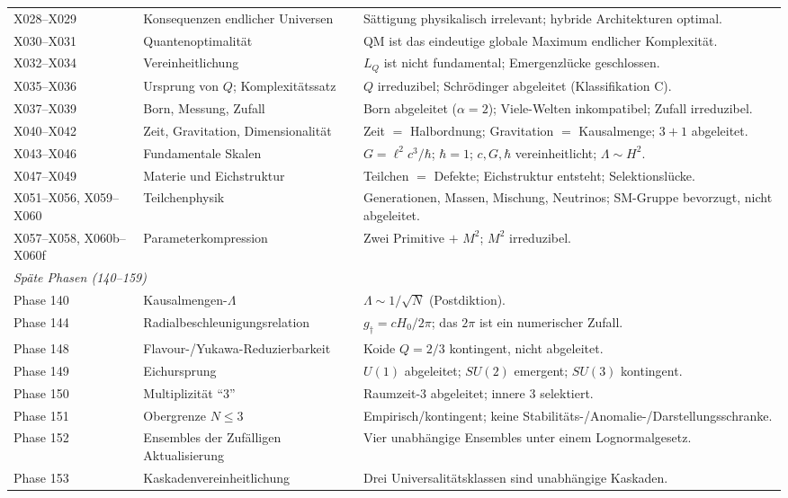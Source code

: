 \documentclass[10pt,twoside,openany]{book}
\begin{document}
\begin{longtable}{p{4.2cm}p{5.2cm}p{5.6cm}}
X028--X029 & Konsequenzen endlicher Universen & Sättigung physikalisch irrelevant; hybride Architekturen optimal. \\
X030--X031 & Quantenoptimalität & QM ist das eindeutige globale Maximum endlicher Komplexität. \\
X032--X034 & Vereinheitlichung & $L_Q$ ist nicht fundamental; Emergenzlücke geschlossen. \\
X035--X036 & Ursprung von $Q$; Komplexitätssatz & $Q$ irreduzibel; Schr\"odinger abgeleitet (Klassifikation C). \\
X037--X039 & Born, Messung, Zufall & Born abgeleitet ($\alpha=2$); Viele-Welten inkompatibel; Zufall irreduzibel. \\
X040--X042 & Zeit, Gravitation, Dimensionalität & Zeit $=$ Halbordnung; Gravitation $=$ Kausalmenge; $3{+}1$ abgeleitet. \\
X043--X046 & Fundamentale Skalen & $G=\ell^2c^3/\hbar$; $\hbar=1$; $c,G,\hbar$ vereinheitlicht; $\Lambda\sim H^2$. \\
X047--X049 & Materie und Eichstruktur & Teilchen $=$ Defekte; Eichstruktur entsteht; Selektionslücke. \\
X051--X056, X059--X060 & Teilchenphysik & Generationen, Massen, Mischung, Neutrinos; SM-Gruppe bevorzugt, nicht abgeleitet. \\
X057--X058, X060b--X060f & Parameterkompression & Zwei Primitive $+$ $M^2$; $M^2$ irreduzibel. \\
\midrule
\multicolumn{3}{l}{\emph{Späte Phasen (140--159)}} \\
\midrule
Phase 140 & Kausalmengen-$\Lambda$ & $\Lambda\sim1/\sqrt N$ (Postdiktion). \\
Phase 144 & Radialbeschleunigungsrelation & $g_\dagger=cH_0/2\pi$; das $2\pi$ ist ein numerischer Zufall. \\
Phase 148 & Flavour-/Yukawa-Reduzierbarkeit & Koide $Q=2/3$ kontingent, nicht abgeleitet. \\
Phase 149 & Eichursprung & $U(1)$ abgeleitet; $SU(2)$ emergent; $SU(3)$ kontingent. \\
Phase 150 & Multiplizität ``3'' & Raumzeit-3 abgeleitet; innere 3 selektiert. \\
Phase 151 & Obergrenze $N\le3$ & Empirisch/kontingent; keine Stabilitäts-/Anomalie-/Darstellungsschranke. \\
Phase 152 & Ensembles der Zufälligen Aktualisierung & Vier unabhängige Ensembles unter einem Lognormalgesetz. \\
Phase 153 & Kaskadenvereinheitlichung & Drei Universalitätsklassen sind unabhängige Kaskaden. \\

\end{longtable}
\end{document}
